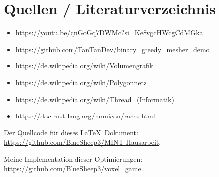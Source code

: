 \section{Quellen / Literaturverzeichnis}

\begin{itemize}
	\item \url{https://youtu.be/qnGoGq7DWMc?si=Ke8vgcHWcgCdMGka}
	\item \url{https://github.com/TanTanDev/binary_greedy_mesher_demo}

	\item \url{https://de.wikipedia.org/wiki/Volumengrafik}
	\item \url{https://de.wikipedia.org/wiki/Polygonnetz}
	\item \url{https://de.wikipedia.org/wiki/Thread_(Informatik)}
	\item \url{https://doc.rust-lang.org/nomicon/races.html}
\end{itemize}

\setlength{\parindent}{0pt}

Der Quellcode für dieses \LaTeX\ Dokument: \\
\url{https://github.com/BlueSheep3/MINT-Hausarbeit}.

\vspace{0.2cm}

Meine Implementation dieser Optimierungen: \\
\url{https://github.com/BlueSheep3/voxel_game}.
